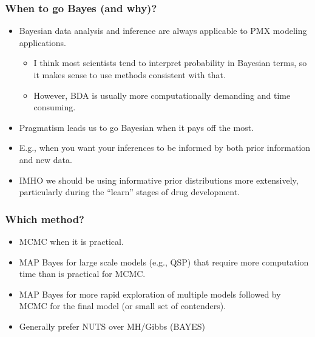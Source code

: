 \documentclass[handout]{beamer}
\begin{document}
\begin{frame}
  \frametitle{When to go Bayes (and why)?}
  
  \begin{itemize}
  \item Bayesian data analysis and inference are always applicable to
    PMX modeling applications. 
    \begin{itemize}
    \item I think most scientists tend to
    interpret probability in Bayesian terms, so it makes sense to use
    methods consistent with that. 
\item However, BDA is usually more
    computationally demanding and time consuming.
    \end{itemize}
  \item Pragmatism leads us to go Bayesian when it pays off the most.
  \item E.g., when you want your inferences to be informed by both prior
    information and new data.
  \item IMHO we should be using informative prior distributions more
    extensively, particularly during the “learn” stages of drug
    development.
  \end{itemize}

\end{frame}

\begin{frame}
  \frametitle{Which method?}
  
  \begin{itemize}
  \item MCMC when it is practical.
  \item MAP Bayes for large scale models (e.g., QSP) that require more
    computation time than is practical for MCMC.
  \item MAP Bayes for more rapid exploration of multiple models
    followed by MCMC for the final model (or small set of contenders).
  \item Generally prefer NUTS over MH/Gibbs (BAYES)
  \end{itemize}

\end{frame}


  
\end{document}
